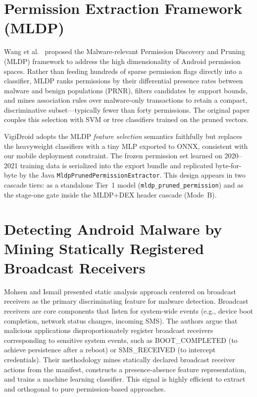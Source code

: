 \section{Permission Extraction Framework (MLDP)}
Wang et al.~\cite{mldp} proposed the Malware-relevant Permission Discovery and Pruning (MLDP) framework to address the high dimensionality of Android permission spaces. Rather than feeding hundreds of sparse permission flags directly into a classifier, MLDP ranks permissions by their differential presence rates between malware and benign populations (PRNR), filters candidates by support bounds, and mines association rules over malware-only transactions to retain a compact, discriminative subset---typically fewer than forty permissions. The original paper couples this selection with SVM or tree classifiers trained on the pruned vectors.

VigiDroid adopts the MLDP \emph{feature selection} semantics faithfully but replaces the heavyweight classifiers with a tiny MLP exported to ONNX, consistent with our mobile deployment constraint. The frozen permission set learned on 2020--2021 training data is serialized into the export bundle and replicated byte-for-byte by the Java \texttt{MldpPrunedPermissionExtractor}. This design appears in two cascade tiers: as a standalone Tier~1 model (\texttt{mldp\_pruned\_permission}) and as the stage-one gate inside the MLDP+DEX header cascade (Mode~B).

\section{Detecting Android Malware by Mining Statically Registered Broadcast Receivers}
Mohsen and Ismail presented \cite{broadcast} static analysis approach centered on broadcast receivers as the primary discriminating feature for malware detection. Broadcast receivers are core components that listen for system-wide events (e.g., device boot completion, network status changes, incoming SMS). The authors argue that malicious applications disproportionately register broadcast receivers corresponding to sensitive system events, such as BOOT\_COMPLETED (to achieve persistence after a reboot) or SMS\_RECEIVED (to intercept credentials). Their methodology mines statically declared broadcast receiver actions from the manifest, constructs a presence-absence feature representation, and trains a machine learning classifier. This signal is highly efficient to extract and orthogonal to pure permission-based approaches.\\

